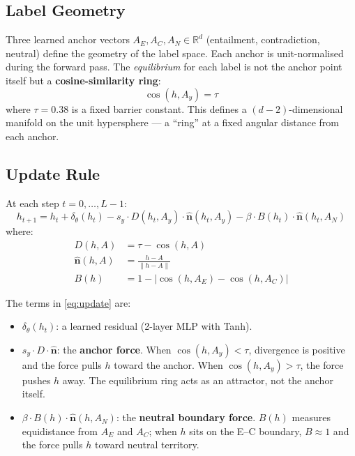 \documentclass[11pt]{article}
\newcommand{\anchor}[1]{A_{#1}}
\newcommand{\barrier}{\tau}
\newcommand{\dive}{D}
\newcommand{\nhat}{\hat{\bm{n}}}
\newcommand{\R}{\mathbb{R}}
\begin{document}
\subsection{Label Geometry}

Three learned anchor vectors $\anchor{E}, \anchor{C}, \anchor{N} \in \R^d$
(entailment, contradiction, neutral) define the geometry of the label
space. Each anchor is unit-normalised during the forward pass. The
\emph{equilibrium} for each label is not the anchor point itself but a
\textbf{cosine-similarity ring}:
\[
    \cos(h, \anchor{y}) = \barrier
\]
where $\barrier = 0.38$ is a fixed barrier constant. This defines a
$(d-2)$-dimensional manifold on the unit hypersphere --- a ``ring''
at a fixed angular distance from each anchor.

\subsection{Update Rule}

At each step $t = 0, \ldots, L-1$:
\begin{equation}
\label{eq:update}
    h_{t+1} = h_t
    + \delta_\theta(h_t)
    - s_y \cdot \dive(h_t, \anchor{y}) \cdot \nhat(h_t, \anchor{y})
    - \beta \cdot B(h_t) \cdot \nhat(h_t, \anchor{N})
\end{equation}
where:
\begin{align}
    \dive(h, A) &= \barrier - \cos(h, A) \label{eq:divergence} \\
    \nhat(h, A) &= \frac{h - A}{\|h - A\|} \label{eq:direction} \\
    B(h) &= 1 - |\cos(h, \anchor{E}) - \cos(h, \anchor{C})| \label{eq:boundary}
\end{align}

The terms in \eqref{eq:update} are:
\begin{itemize}
    \item $\delta_\theta(h_t)$: a learned residual (2-layer MLP with Tanh).
    \item $s_y \cdot \dive \cdot \nhat$: the \textbf{anchor force}. When
          $\cos(h, A_y) < \barrier$, divergence is positive and the force
          pulls $h$ toward the anchor. When $\cos(h, A_y) > \barrier$,
          the force pushes $h$ away. The equilibrium ring acts as an
          attractor, not the anchor itself.
    \item $\beta \cdot B(h) \cdot \nhat(h, A_N)$: the \textbf{neutral
          boundary force}. $B(h)$ measures equidistance from $\anchor{E}$
          and $\anchor{C}$; when $h$ sits on the E--C boundary, $B \approx 1$
          and the force pulls $h$ toward neutral territory.
\end{itemize}
\end{document}
